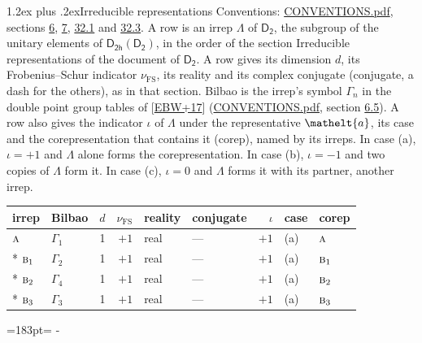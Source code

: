 \documentclass[10pt,a4paper]{article}
\makeatletter
\renewcommand\section{\@startsection{section}{1}{\z@}{-3ex plus -1ex minus -.2ex}%
  {1.2ex plus .2ex}{\normalfont\large\sffamily\bfseries\color{parttitle}}}
\newcommand{\needspace}[1]{\par\penalty-100\begingroup\dimen0=#1\relax\dimen2=\pagegoal
  \advance\dimen2-\pagetotal\ifdim\dimen0>\dimen2\relax\ifdim\dimen2>0pt\vfil\break\fi\fi
  \endgroup}
\numberwithin{equation}{section}
\newcommand{\eltfont}[1]{{\let\sigma\eltsigma\mathelt{#1}}}
\newcommand{\grp}[1]{\mathsf{#1}}
\newcommand{\irr}[1]{\text{\normalfont\scshape #1}}
\newcommand{\elt}[1]{\eltfont{#1}}
\newcommand{\fsind}{\nu_{\mathrm{FS}}}
\makeatother
\begin{document}
\section{Irreducible representations}\label{s:irreps}
Conventions: \href{../../CONVENTIONS.pdf}{CONVENTIONS.pdf}, sections \href{../../../rotation/CONVENTIONS.pdf\#conv.6}{6}, \href{../../../rotation/CONVENTIONS.pdf\#conv.7}{7}, \href{../../CONVENTIONS.pdf\#conv.32.1}{32.1} and \href{../../CONVENTIONS.pdf\#conv.32.3}{32.3}.
\leavevmode\label{n:irrep.Delta}A row is an irrep $\Lambda$ of $\grp{D_{2}}$, the subgroup of the unitary elements of $\grp{D_{2h}}(\grp{D_{2}})$, in the order of the section Irreducible representations of the document of \href{../../../rotation/data/pdf/D2.pdf}{$\grp{D_{2}}$}. \label{n:index.dimension}\label{n:index.frobenius}\label{n:head.irrep}\label{n:head.reality}\label{n:head.conjugate}A row gives its dimension $d$, its Frobenius--Schur indicator $\fsind$, its reality and its complex conjugate (conjugate, a dash for the others), as in that section. \label{n:head.bilbao}\label{n:irrep.alias.gamma}Bilbao is the irrep's symbol $\Gamma_n$ in the double point group tables of [\href{../../../REFERENCES.pdf\#ref.EBW+17}{EBW+17}] (\href{../../CONVENTIONS.pdf}{CONVENTIONS.pdf}, section \href{../../../rotation/CONVENTIONS.pdf\#conv.6.5}{6.5}). \label{n:head.case.corep}\label{n:head.corep}A row also gives the indicator $\iota$ of $\Lambda$ under the representative $\elt{a}$, its case and the corepresentation that contains it (corep), named by its irreps. In case (a), $\iota = +1$ and $\Lambda$ alone forms the corepresentation. In case (b), $\iota = -1$ and two copies of $\Lambda$ form it. In case (c), $\iota = 0$ and $\Lambda$ forms it with its partner, another irrep.
\setlength{\emergencystretch}{2em}\par\setlength{\emergencystretch}{0pt}
{\small\renewcommand{\arraystretch}{1.25}\setlength{\tabcolsep}{4pt}\begin{longtable}{@{}llrrllrll@{}}\toprule
irrep & Bilbao & $d$ & $\fsind$ & reality & conjugate & $\iota$ & case & corep\\\midrule\endhead
\bottomrule\endfoot\endlastfoot
$\irr{a}$ & $\Gamma_{1}$ & 1 & $+1$ & real & --- & $+1$ & (a) & $\irr{a}$\\*
$\irr{b}_{1}$ & $\Gamma_{2}$ & 1 & $+1$ & real & --- & $+1$ & (a) & $\irr{b}_{1}$\\*
$\irr{b}_{2}$ & $\Gamma_{4}$ & 1 & $+1$ & real & --- & $+1$ & (a) & $\irr{b}_{2}$\\*
$\irr{b}_{3}$ & $\Gamma_{3}$ & 1 & $+1$ & real & --- & $+1$ & (a) & $\irr{b}_{3}$\\
\bottomrule\end{longtable}}
\needspace{183pt}
\end{document}
